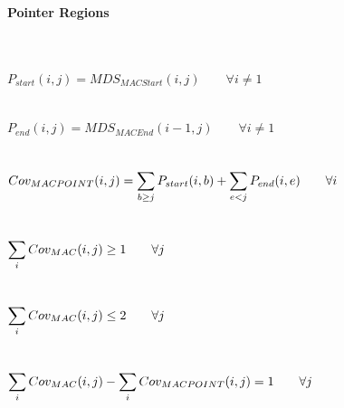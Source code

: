 \paragraph{Pointer Regions} $ $
\\\\\\
$P_{start}(i,j) = MDS_{MACStart}(i,j) \qquad \forall i \neq 1$ \\\\\\
$P_{end}(i,j) = MDS_{MACEnd}(i-1,j) \qquad \forall i \neq 1$ \\\\\\
$Cov_{MACPOINT}(i,j) = \mathlarger{\sum_{b \geq j} P_{start}(i,b) + \sum_{e < j} P_{end}(i,e) \qquad \forall i}$ \\\\\\
$\mathlarger{\sum_{i} Cov_{MAC}(i,j) \geq 1 \qquad \forall j }$ \\\\\\
$\mathlarger{\sum_{i} Cov_{MAC}(i,j) \leq 2 \qquad \forall j }$ \\\\\\
$\mathlarger{\sum_{i} Cov_{MAC}(i,j) - \sum_{i} Cov_{MACPOINT}(i,j) = 1 \qquad \forall j}$ \\\\\\

